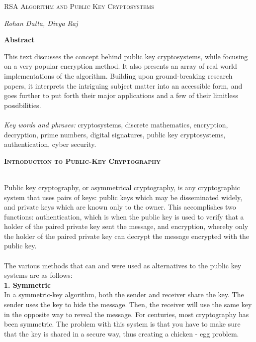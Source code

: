 \documentclass[12 pt]{article}
\begin{document}
\begin{titlepage}
\begin{Huge}
\begin{center}
\textsc{ RSA Algorithm \linebreak
and \linebreak
Public Key Cryptosystems}
\end{center}
\end{Huge}
\begin{center}
\begin{large}
\textsl{ Rohan Datta, Divya Raj}
\end{large}
\end{center}

\bigskip 
\begin{center}
\textbf{Abstract}
\end{center}
This text discusses the concept behind public key cryptosystems, while focusing on a very popular encryption method. It also presents an array of real world implementations of the algorithm.
Building upon ground-breaking research papers, it interprets the intriguing subject matter into an accessible form, and goes further to put forth their major applications and a few of their limitless possibilities.
\\
\\
\textit{Key words and phrases:} cryptosystems, discrete mathematics, encryption, decryption, prime numbers, digital signatures, public key cryptosystems, authentication, cyber security.
\end{titlepage}
\pagebreak
\begin{LARGE}	
\begin{center}
\textbf{\textsc{Introduction to Public-Key Cryptography}}
\end{center}
\end{LARGE}

\noindent 
\\Public key cryptography, or asymmetrical cryptography, is any cryptographic system that uses pairs of keys: public keys which may be disseminated widely, and private keys which are known only to the owner. This accomplishes two functions: authentication, which is when the public key is used to verify that a holder of the paired private key sent the message, and encryption, whereby only the holder of the paired private key can decrypt the message encrypted with the public key.
\\\\The various methods that can and were used as alternatives to the public key systems are as follows:
\\\textbf{1. Symmetric}\\In a symmetric-key algorithm, both the sender and receiver share the key. The sender uses the key to hide the message. Then, the receiver will use the same key in the opposite way to reveal the message. For centuries, most cryptography has been symmetric. The problem with this system is that you have to make sure that the key is shared in a secure way, thus creating a chicken - egg problem.
\end{document}
